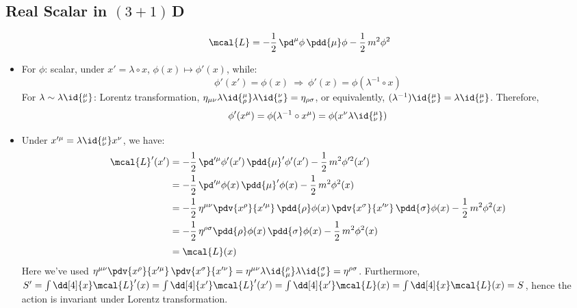 \documentclass[a4paper,10pt]{article}
\begin{document}
\subsection{Real Scalar in $(3+1)$\,D}
	\vspace{-.8\baselineskip}
	\begin{equation}
		\mcal{L}
		= -\frac{1}{2}\,
			\pd^\mu\phi\,
			\pdd{\mu}\phi
		-\frac{1}{2}\,m^2\phi^2
	\end{equation}
	\begin{itemize}
	\item For $\phi$: scalar, under $
		x' = \lambda\circ x
	$, $\phi(x)\mapsto \phi'(x)$, while:
	\begin{equation}
		\phi'(x') = \phi(x)
		\ \Longrightarrow\ %
		\phi'(x) = \phi(\lambda^{-1}\circ x)
	\end{equation}
	For $\lambda\sim \lambda\id{^\mu_\nu}$: Lorentz transformation, $
		\eta_{\mu\nu}
			\lambda\id{^\mu_\rho}
			\lambda\id{^\nu_\sigma}
		= \eta_{\rho\sigma}
	$, or equivalently, $
		(\lambda^{-1})\id{^\mu_\nu}
		= \lambda\id{_\nu^\mu}
	$. Therefore,
	\begin{equation}
		\phi'(x^\mu) = \phi(\lambda^{-1}\circ x^\mu)
		= \phi(x^\nu\lambda\id{_\nu^\mu})
	\end{equation}
\pagebreak[3]
	
	\item Under $
		x'^\mu = \lambda\id{^\mu_\nu} x^\nu
	$, we have:
	\begin{equation}
	\begin{aligned}
		\mcal{L}'(x')
		&= - \frac{1}{2}\,
			\pd'^\mu\phi'(x')\,
			\pdd{\mu}'\phi'(x')
		- \frac{1}{2}\,m^2\phi'^2(x') \\
		&= - \frac{1}{2}\,
			\pd'^\mu\phi(x)\,
			\pdd{\mu}'\phi(x)
		- \frac{1}{2}\,m^2\phi^2(x) \\
		&= - \frac{1}{2}\,
			\eta^{\mu\nu}
			\pdv{x^\rho}{x'^\mu}\,
			\pdd{\rho}\phi(x)\,
			\pdv{x^\sigma}{x'^\nu}\,
			\pdd{\sigma}\phi(x)
		- \frac{1}{2}\,m^2\phi^2(x) \\
		&= - \frac{1}{2}\,
			\eta^{\rho\sigma}
			\pdd{\rho}\phi(x)\,
			\pdd{\sigma}\phi(x)
		- \frac{1}{2}\,m^2\phi^2(x) \\[.5ex]
		&= \mcal{L}(x)
	\end{aligned}
	\end{equation}
	Here we've used $
		\eta^{\mu\nu}
		\pdv{x^\rho}{x'^\mu}\,
		\pdv{x^\sigma}{x'^\nu}
		= \eta^{\mu\nu}
			\lambda\id{_\mu^\rho}
			\lambda\id{_\nu^\sigma}
		= \eta^{\rho\sigma}
	$. Furthermore, $
		S' = \int \dd[4]{x} \mcal{L}'(x)
		= \int \dd[4]{x'} \mcal{L}'(x')
		= \int \dd[4]{x'} \mcal{L}(x)
		= \int \dd[4]{x} \mcal{L}(x)
		= S
	$, hence the action is invariant under Lorentz transformation. 
	

\end{itemize}
\end{document}
